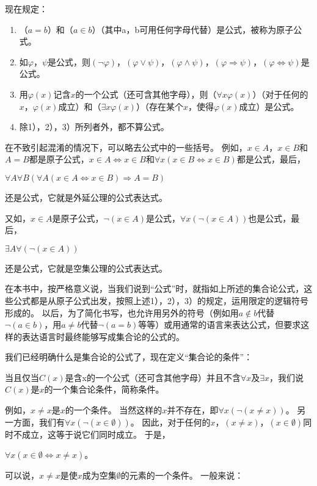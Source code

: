现在规定：
\begin{enumerate}[label=\arabic*）]
\item （$a=b$）和（$a \in b$）（其中a，b可用任何字母代替）是公式，被称为原子公式。
\item 如$\varphi$，$\psi$是公式，则$(\neg \varphi)$，$(\varphi \lor \psi)$，$(\varphi \land \psi)$，$(\varphi \Rightarrow \psi)$，$(\varphi \Leftrightarrow \psi)$是公式。
\item 用$\varphi(x)$记含$x$的一个公式（还可含其他字母），则（$\forall x \varphi(x)$）（对于任何的$x$，$\varphi(x)$成立）和（$\exists x \varphi (x)$）（存在某个$x$，使得$\varphi (x)$成立）是公式。
\item 除1），2），3）所列者外，都不算公式。
\end{enumerate}

在不致引起混淆的情况下，可以略去公式中的一些括号。
例如，$x \in A$，$x \in B$和$A=B$都是原子公式，$x \in A \Leftrightarrow x \in B$和$\forall x (x \in B \Leftrightarrow x \in B)$都是公式，最后，
\begin{center}
$\forall A \forall B (\forall A (x \in A \Leftrightarrow x \in B) \Rightarrow A = B)$
\end{center}
还是公式，它就是外延公理的公式表达式。

又如，$x \in A$是原子公式，$\neg(x \in A)$是公式，$\forall x (\neg (x \in A))$也是公式，最后，
\begin{center}
$\exists A \forall (\neg (x \in A))$
\end{center}
还是公式，它就是空集公理的公式表达式。

在本书中，按严格意义说，当我们说到“公式”时，就指如上所述的集合论公式，这些公式都是从原子公式出发，按照上述1），2），3）的规定，运用限定的逻辑符号形成的。
以后，为了简化书写，也允许用另外的符号（例如用$a \notin b$代替$\neg (a \in b)$，用$a \neq b$代替$\neg (a=b)$等等）或用通常的语言来表达公式，但要求这样的表达语言时最终能够写成集合论的公式的。

\hspace*{\fill}

我们已经明确什么是集合论的公式了，现在定义“集合论的条件”：

当且仅当$C(x)$是含x的一个公式（还可含其他字母）并且不含$\forall x$及$\exists x$，我们说$C(x)$是$x$的一个集合论条件，简称条件。

例如，$x \neq x$是$x$的一个条件。
当然这样的$x$并不存在，即$\forall x (\neg(x \neq x))$。
另一方面，我们有$\forall x (\neg(x \in \emptyset))$。
因此，对于任何的$x$，$(x \neq x)$，$(x \in \emptyset)$同时不成立，这等于说它们同时成立。
于是，
\begin{center}
$\forall x (x \in \emptyset \Leftrightarrow x \neq x)$。
\end{center}
可以说，$x \neq x$是使$x$成为空集$\emptyset$的元素的一个条件。
一般来说：

